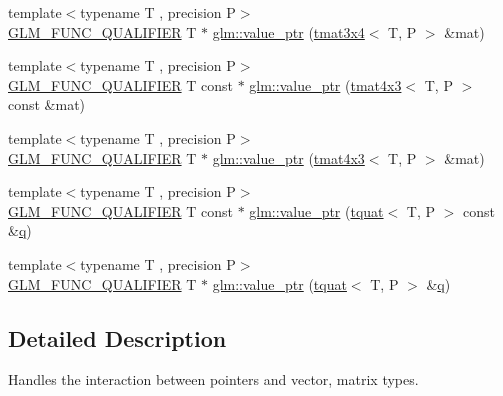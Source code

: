\begin{DoxyCompactItemize}
\item 
{\footnotesize template$<$typename T , precision P$>$ }\\\mbox{\hyperlink{setup_8hpp_a33fdea6f91c5f834105f7415e2a64407}{G\+L\+M\+\_\+\+F\+U\+N\+C\+\_\+\+Q\+U\+A\+L\+I\+F\+I\+ER}} T $\ast$ \mbox{\hyperlink{group__gtc__type__ptr_gafac7c10d557c3db2f061af0ffe8fc9cf}{glm\+::value\+\_\+ptr}} (\mbox{\hyperlink{structglm_1_1tmat3x4}{tmat3x4}}$<$ T, P $>$ \&mat)
\item 
{\footnotesize template$<$typename T , precision P$>$ }\\\mbox{\hyperlink{setup_8hpp_a33fdea6f91c5f834105f7415e2a64407}{G\+L\+M\+\_\+\+F\+U\+N\+C\+\_\+\+Q\+U\+A\+L\+I\+F\+I\+ER}} T const  $\ast$ \mbox{\hyperlink{group__gtc__type__ptr_ga72b0a496d6c190645accac32f48f64bb}{glm\+::value\+\_\+ptr}} (\mbox{\hyperlink{structglm_1_1tmat4x3}{tmat4x3}}$<$ T, P $>$ const \&mat)
\item 
{\footnotesize template$<$typename T , precision P$>$ }\\\mbox{\hyperlink{setup_8hpp_a33fdea6f91c5f834105f7415e2a64407}{G\+L\+M\+\_\+\+F\+U\+N\+C\+\_\+\+Q\+U\+A\+L\+I\+F\+I\+ER}} T $\ast$ \mbox{\hyperlink{group__gtc__type__ptr_gab9cba81cd8a7eb0afc9ac2b9f4fe05ca}{glm\+::value\+\_\+ptr}} (\mbox{\hyperlink{structglm_1_1tmat4x3}{tmat4x3}}$<$ T, P $>$ \&mat)
\item 
{\footnotesize template$<$typename T , precision P$>$ }\\\mbox{\hyperlink{setup_8hpp_a33fdea6f91c5f834105f7415e2a64407}{G\+L\+M\+\_\+\+F\+U\+N\+C\+\_\+\+Q\+U\+A\+L\+I\+F\+I\+ER}} T const  $\ast$ \mbox{\hyperlink{group__gtc__type__ptr_ga26a38ff14840b35c57fa937711c5168c}{glm\+::value\+\_\+ptr}} (\mbox{\hyperlink{structglm_1_1tquat}{tquat}}$<$ T, P $>$ const \&\mbox{\hyperlink{glad_8h_a514729309336df22bcc8eda979d6ced4}{q}})
\item 
{\footnotesize template$<$typename T , precision P$>$ }\\\mbox{\hyperlink{setup_8hpp_a33fdea6f91c5f834105f7415e2a64407}{G\+L\+M\+\_\+\+F\+U\+N\+C\+\_\+\+Q\+U\+A\+L\+I\+F\+I\+ER}} T $\ast$ \mbox{\hyperlink{group__gtc__type__ptr_ga637414d7a9e8877e66a59f3b3d700898}{glm\+::value\+\_\+ptr}} (\mbox{\hyperlink{structglm_1_1tquat}{tquat}}$<$ T, P $>$ \&\mbox{\hyperlink{glad_8h_a514729309336df22bcc8eda979d6ced4}{q}})
\end{DoxyCompactItemize}


\subsection{Detailed Description}
Handles the interaction between pointers and vector, matrix types. 

